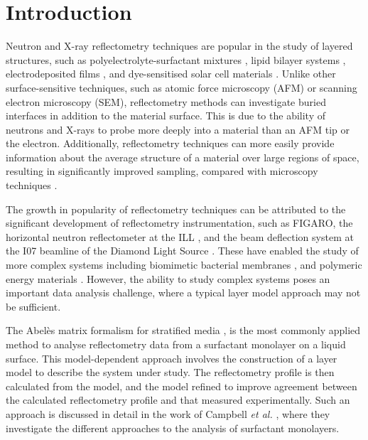 \documentclass[amsmath,amssymb,twocolumn,superscriptaddress]{revtex4-1}
\begin{document}
\maketitle                        %

\section{Introduction}

Neutron and X-ray reflectometry techniques are popular in the study of
layered structures, such as polyelectrolyte-surfactant
mixtures \cite{llamas_study_2018}, lipid bilayer
systems \cite{waldie_localization_2018}, electrodeposited
films \cite{beebee_effect_2019}, and dye-sensitised solar cell
materials \cite{mccree-grey_preferred_2015}.
Unlike other surface-sensitive techniques, such as atomic force microscopy
(AFM) or scanning electron microscopy (SEM), reflectometry methods can
investigate buried interfaces in addition to the material surface.
This is due to the ability of neutrons and X-rays to probe more deeply into
a material than an AFM tip or the electron.
Additionally, reflectometry techniques can more easily provide information
about the average structure of a material over large regions of space,
resulting in significantly improved sampling, compared with microscopy
techniques \cite{renaud_probing_2009}.

The growth in popularity of reflectometry techniques can be attributed to
the significant development of reflectometry instrumentation, such as
FIGARO, the horizontal neutron reflectometer at the
ILL \cite{campbell_figaro_2011}, and the beam deflection system at the I07
beamline of the Diamond Light Source \cite{arnold_implementation_2012}.
These have enabled the study of more complex systems including biomimetic
bacterial membranes \cite{barker_neutron_2016}, and polymeric energy
materials \cite{khodakarimi_x-ray_2016}.
However, the ability to study complex systems poses an important data
analysis challenge, where a typical layer model approach may not be
sufficient.

The Abel\`{e}s matrix formalism for stratified media \cite{abeles_sur_1948}, is
the most commonly applied method to analyse reflectometry data from a
surfactant monolayer on a liquid surface.
This model-dependent approach involves the construction of a layer model to
describe the system under study.
The reflectometry profile is then calculated from the model, and the model
refined to improve agreement between the calculated reflectometry profile
and that measured experimentally.
Such an approach is discussed in detail in the work of
Campbell \emph{et al.} \cite{campbell_structure_2018}, where they investigate
the different approaches to the analysis of surfactant monolayers.
\end{document}
